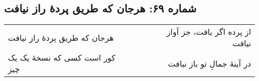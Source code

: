\begin{center}
\section*{شماره ۶۹: هرجان که طریق پردۀ راز نیافت}
\label{sec:069}
\begin{longtable}{l p{0.5cm} r}
هرجان که طریق پردهٔ راز نیافت
&&
از پرده اگر یافت، جز آواز نیافت
\\
کور است کسی که نسخهٔ یک یک چیز
&&
در آینهٔ جمالِ تو باز نیافت
\\
\end{longtable}
\end{center}
